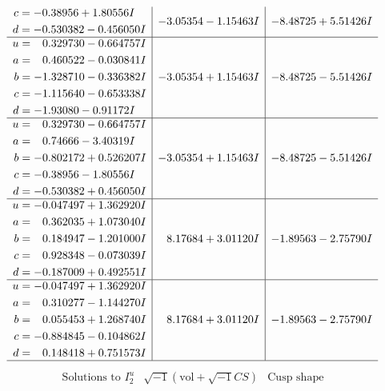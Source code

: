 \documentclass[1p]{elsarticle_modified}
\theoremstyle{definition}
\newcommand{\I}{\sqrt{-1}}
\begin{document}
$$\begin{array}{c|c|c}
\begin{aligned}
c &= -0.38956 + 1.80556 I \\
d &= -0.530382 - 0.456050 I\end{aligned}
 & -3.05354 - 1.15463 I & -8.48725 + 5.51426 I \\ \hline\begin{aligned}
u &= \phantom{-}0.329730 - 0.664757 I \\
a &= \phantom{-}0.460522 - 0.030841 I \\
b &= -1.328710 - 0.336382 I \\
c &= -1.115640 - 0.653338 I \\
d &= -1.93080 - 0.91172 I\end{aligned}
 & -3.05354 + 1.15463 I & -8.48725 - 5.51426 I \\ \hline\begin{aligned}
u &= \phantom{-}0.329730 - 0.664757 I \\
a &= \phantom{-}0.74666 - 3.40319 I \\
b &= -0.802172 + 0.526207 I \\
c &= -0.38956 - 1.80556 I \\
d &= -0.530382 + 0.456050 I\end{aligned}
 & -3.05354 + 1.15463 I & -8.48725 - 5.51426 I \\ \hline\begin{aligned}
u &= -0.047497 + 1.362920 I \\
a &= \phantom{-}0.362035 + 1.073040 I \\
b &= \phantom{-}0.184947 - 1.201000 I \\
c &= \phantom{-}0.928348 - 0.073039 I \\
d &= -0.187009 + 0.492551 I\end{aligned}
 & \phantom{-}8.17684 + 3.01120 I & -1.89563 - 2.75790 I \\ \hline\begin{aligned}
u &= -0.047497 + 1.362920 I \\
a &= \phantom{-}0.310277 - 1.144270 I \\
b &= \phantom{-}0.055453 + 1.268740 I \\
c &= -0.884845 - 0.104862 I \\
d &= \phantom{-}0.148418 + 0.751573 I\end{aligned}
 & \phantom{-}8.17684 + 3.01120 I & -1.89563 - 2.75790 I\\
 \hline 
 \end{array}$$\newpage$$\begin{array}{c|c|c}  
\text{Solutions to }I^u_{2}& \I (\text{vol} + \sqrt{-1}CS) & \text{Cusp shape}\\

\end{array}$$
\end{document}
